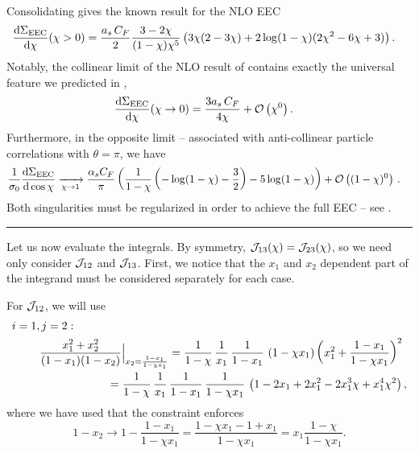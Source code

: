 Consolidating gives the known result for the NLO EEC \cite{Basham:1978bw}
\begin{align}
    \label{eq:ee_to_hadrons_eec_nlo}
    \frac{\dd\Sigma_\text{EEC}}{\dd\chi}(\chi>0)
    &=
    \frac{\ascf}{2}
    \frac{3-2\chi}{(1-\chi)\chi^5}
    \le(
        3 \chi (2 - 3 \chi)
        +
        2 \log(1 - \chi) (2 \chi^2 - 6 \chi + 3)
    \ri)
    .
\end{align}
%
Notably, the collinear limit of the NLO result of  contains exactly the universal feature we predicted in ,
\begin{align}
    \frac{\dd\Sigma_\text{EEC}}{\dd\chi}(\chi\to 0)
    &=
    \frac{3a_s \, C_F}{4\chi}
    +
    \mathcal{O}\left(\chi^0\right)
    .
\end{align}
%
Furthermore, in the opposite limit -- associated with anti-collinear particle correlations with \(\theta = \pi\), we have
\begin{align}
    \frac{1}{\sigma_0}
    \dv{\Sigma_\text{EEC}}{\cos\chi}{}
    &\xrightarrow[\chi\to 1]{}
    \frac{\alpha_s C_F}{\pi}
    \left(
        \frac{1}{1-\chi}
        \left(
            -\log(1-\chi)
            -\frac{3}{2}
        \right)
        - 5 \log(1-\chi)
    \right)
    + \mathcal{O}\left((1-\chi)^0\right)
    \,.
\end{align}
%
Both singularities must be regularized in order to achieve the full EEC -- see .



\vspace{7pt}
\hrule
\vspace{7pt}

Let us now evaluate the integrals.
%
By symmetry, \(\mathcal{J}_{13}(\chi) = \mathcal{J}_{23}(\chi)\), so we need only consider \(\mathcal{J}_{12}\) and \(\mathcal{J}_{13}\).
%
First, we notice that the \(x_1\) and \(x_2\) dependent part of the integrand must be considered separately for each case.

For \(\mathcal{J}_{12}\), we will use
\begin{align}
    i=1,&\,j=2:\notag
    \\
    \label{eq:constrained_integrand_12}
    &\frac{x_1^2 + x_2^2}{(1-x_1)(1-x_2)}
    \Big|_{x_2 = \frac{1-x_1}{1-\chi x_1}}
    =
    \frac{1}{1-\chi}\,
    \frac{1}{x_1}\,
    \frac{1}{1-x_1}\,
    \le(1 - \chi x_1\ri)
    \le(x_1^2 + \frac{1 - x_1}{1 - \chi x_1}\ri)^2
    \\
    &
    \qquad\qquad\qquad
    =
    \frac{1}{1-\chi}\,
    \frac{1}{x_1}\,
    \frac{1}{1-x_1}\,
    \frac{1}{1 - \chi x_1}\,
    \le(
        1 - 2 x_1 + 2 x_1^2 - 2 x_1^3 \chi + x_1^4 \chi^2
    \ri)
    \notag
    ,
\end{align}
where we have used that the constraint enforces
\begin{equation}
    1 - x_2
    \to
    1 - \frac{1-x_1}{1 - \chi x_1}
    =
    \frac{1 - \chi x_1 - 1 + x_1}{1 - \chi x_1}
    =
    x_1\frac{1-\chi}{1 - \chi x_1}
    .
\end{equation}

